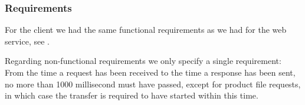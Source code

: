 \subsubsection{Requirements}
For the client we had the same functional requirements as we had for the web service, see .

Regarding non-functional requirements we only specify a single requirement: From the time a request has been received to the time a response has been sent, no more than 1000 millisecond must have passed, except for product file requests, in which case the transfer is required to have started within this time.